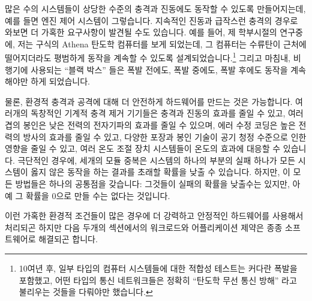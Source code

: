 많은 수의 시스템들이 상당한 수준의 충격과 진동에도 동작할 수 있도록
만들어지는데, 예를 들면 엔진 제어 시스템이 그렇습니다.
지속적인 진동과 급작스런 충격의 경우로 와보면 더 가혹한 요구사항이 발견될 수도
있습니다.
예를 들어, 제 학부시절의 연구중에, 저는 구식의 Athena 탄도학 컴퓨터를 보게
되었는데, 그 컴퓨터는 수류탄이 근처에 떨어지더라도 평범하게 동작을 계속할 수
있도록 설계되었습니다.\footnote{
	10여년 후, 일부 타입의 컴퓨터 시스템들에 대한 적합성 테스트는 커다란
	폭발을 포함했고, 어떤 타입의 통신 네트워크들은 정확히 ``탄도학 무선
	통신 방해'' 라고 불리우는 것들을 다뤄야만 했습니다.}
그리고 마침내, 비행기에 사용되는 ``블랙 박스'' 들은 폭발 전에도, 폭발 중에도,
폭발 후에도 동작을 계속해야만 하게 되었습니다.

물론, 환경적 충격과 공격에 대해 더 안전하게 하드웨어를 만드는 것은 가능합니다.
여러개의 독창적인 기계적 충격 제거 기기들은 충격과 진동의 효과를 줄일 수 있고,
여러겹의 봉인은 낮은 전력의 전자기파의 효과를 줄일 수 있으며, 에러 수정 코딩은
높은 전력의 방사의 효과를 줄일 수 있고, 다양한 포장과 봉인 기술이 공기 청정
수준으로 인한 영향을 줄일 수 있고, 여러 온도 조절 장치 시스템들이 온도의 효과에
대응할 수 있습니다.
극단적인 경우에, 세개의 모듈 중복은 시스템의 하나의 부분의 실패 하나가 모든
시스템이 옳지 않은 동작을 하는 결과를 초래할 확률을 낮출 수 있습니다.
하지만, 이 모든 방법들은 하나의 공통점을 갖습니다: 그것들이 실패의 확률을
낮출수는 있지만, 아예 그 확률을 0으로 만들 수는 없다는 것입니다.

이런 가혹한 환경적 조건들이 많은 경우에 더 강력하고 안정적인 하드웨어를
사용해서 처리되곤 하지만 다음 두개의 섹션에서의 워크로드와 어플리케이션 제약은
종종 소프트웨어로 해결되곤 합니다.
\iffalse

